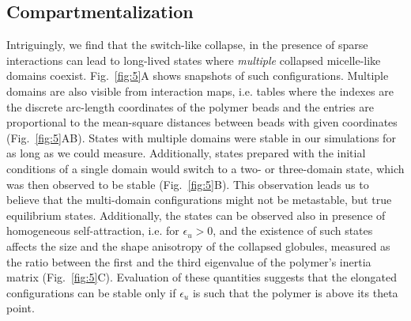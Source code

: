 \documentclass[
preprint,
a4paper,
12pt,
superscriptaddress,
pre]{revtex4}
\begin{document}
\subsection*{Compartmentalization}


Intriguingly, we find that the switch-like collapse, in the presence
of sparse interactions can lead to long-lived states where
\emph{multiple} collapsed micelle-like domains
coexist. Fig.~\ref{fig:5}A shows snapshots of such
configurations. Multiple domains are also visible from interaction
maps, i.e. tables where the indexes are the discrete arc-length
coordinates of the polymer beads and the entries are proportional to
the mean-square distances between beads with given coordinates
(Fig.~\ref{fig:5}AB).
States with multiple domains were stable in our simulations for as
long as we could measure. Additionally, states prepared with the
initial conditions of a single domain would switch to a two- or
three-domain state, which was then observed to be stable
(Fig.~\ref{fig:5}B). This observation leads us to believe that the
multi-domain configurations might not be metastable, but true
equilibrium states.
%
Additionally, the states can be observed also in presence of
homogeneous self-attraction, i.e. for $\epsilon_u>0$, and the
existence of such states affects the size and the shape anisotropy of
the collapsed globules, measured as the ratio between the first and
the third eigenvalue of the polymer's inertia matrix
(Fig.~\ref{fig:5}C). Evaluation of these quantities suggests that the
elongated configurations can be stable only if $\epsilon_u$ is such
that the polymer is above its theta point.
%
%
\end{document}
